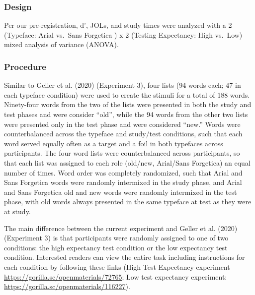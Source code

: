 \documentclass[
  english,
  jou]{apa6}
\begin{document}
\hypertarget{design}{%
\subsubsection{Design}\label{design}}

Per our pre-registration, d', JOLs, and study times were analyzed with a 2 (Typeface: Arial vs.~Sans Forgetica ) x 2 (Testing Expectancy: High vs.~Low) mixed analysis of variance (ANOVA).

\hypertarget{procedure}{%
\subsubsection{Procedure}\label{procedure}}

Similar to Geller et al. (2020) (Experiment 3), four lists (94 words each; 47 in each typeface condition) were used to create the stimuli for a total of 188 words. Ninety-four words from the two of the lists were presented in both the study and test phases and were consider \enquote{old}, while the 94 words from the other two lists were presented only in the test phase and were considered \enquote{new.} Words were counterbalanced across the typeface and study/test conditions, such that each word served equally often as a target and a foil in both typefaces across participants. The four word lists were counterbalanced across participants, so that
each list was assigned to each role (old/new, Arial/Sans Forgetica) an equal number of times. Word order was completely randomized, such that Arial and Sans Forgetica words were randomly intermixed in the study phase, and Arial and Sans Forgetica old and new words were randomly intermixed in the test phase, with old words always presented in the same typeface at test as they were at study.

The main difference between the current experiment and Geller et al. (2020) (Experiment 3) is that participants were randomly assigned to one of two conditions: the high expectancy test condition or the low expectancy test condition. Interested readers can view the entire task including instructions for each condition by following these links (High Test Expectancy experiment \url{https://gorilla.sc/openmaterials/72765}; Low test expectancy experiment: \url{https://gorilla.sc/openmaterials/116227}).
\end{document}
